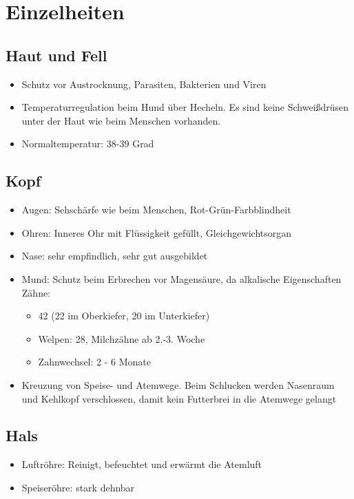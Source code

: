 \section{Einzelheiten}

    \subsection{Haut und Fell}
    \begin{itemize}
        \item Schutz vor Austrocknung, Parasiten, Bakterien und Viren
        \item Temperaturregulation beim Hund über Hecheln. Es sind keine Schweißdrüsen unter der Haut wie beim Menschen vorhanden.
        \item Normaltemperatur: 38-39 Grad
    \end{itemize}

    \subsection{Kopf}
    \begin{itemize}
        \item Augen: Sehschärfe wie beim Menschen, Rot-Grün-Farbblindheit
        \item Ohren: Inneres Ohr mit Flüssigkeit gefüllt, Gleichgewichtsorgan
        \item Nase: sehr empfindlich, sehr gut ausgebildet
        \item Mund: Schutz beim Erbrechen vor Magensäure, da alkalische Eigenschaften \\
              Zähne:
        \begin{itemize}
            \item 42 (22 im Oberkiefer, 20 im Unterkiefer)
            \item Welpen: 28, Milchzähne ab 2.-3. Woche
            \item Zahnwechsel: 2 - 6 Monate
        \end{itemize}
        \item Kreuzung von Speise- und Atemwege. Beim Schlucken werden Nasenraum und Kehlkopf verschlossen, damit kein Futterbrei in die Atemwege gelangt
    \end{itemize}

    \subsection{Hals}
    \begin{itemize}
        \item Luftröhre: Reinigt, befeuchtet und erwärmt die Atemluft
        \item Speiseröhre: stark dehnbar
    \end{itemize}

